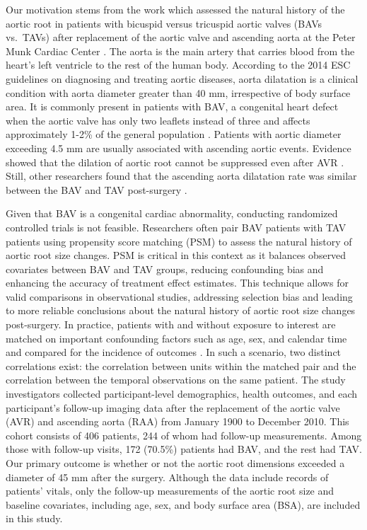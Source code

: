 \documentclass[
]{aft}
\begin{document}
Our motivation stems from the work which assessed the natural history of
the aortic root in patients with bicuspid versus tricuspid aortic valves
(BAVs vs.~TAVs) after replacement of the aortic valve and ascending
aorta at the Peter Munk Cardiac Center \citep{Hui2018}. The aorta is the
main artery that carries blood from the heart's left ventricle to the
rest of the human body. According to the 2014 ESC guidelines on
diagnosing and treating aortic diseases, aorta dilatation is a clinical
condition with aorta diameter greater than 40 mm, irrespective of body
surface area. It is commonly present in patients with BAV, a congenital
heart defect when the aortic valve has only two leaflets instead of
three and affects approximately 1-2\% of the general population
\citep{Wang2021}. Patients with aortic diameter exceeding 4.5 mm are
usually associated with ascending aortic events. Evidence showed that
the dilation of aortic root cannot be suppressed even after AVR
\citep{Bruce2003}. Still, other researchers found that the ascending
aorta dilatation rate was similar between the BAV and TAV post-surgery
\citep{KIM202053}.

Given that BAV is a congenital cardiac abnormality, conducting
randomized controlled trials is not feasible. Researchers often pair BAV
patients with TAV patients using propensity score matching (PSM) to
assess the natural history of aortic root size changes. PSM is critical
in this context as it balances observed covariates between BAV and TAV
groups, reducing confounding bias and enhancing the accuracy of
treatment effect estimates. This technique allows for valid comparisons
in observational studies, addressing selection bias and leading to more
reliable conclusions about the natural history of aortic root size
changes post-surgery. In practice, patients with and without exposure to
interest are matched on important confounding factors such as age, sex,
and calendar time and compared for the incidence of outcomes
\citep{Iwagami2022}. In such a scenario, two distinct correlations
exist: the correlation between units within the matched pair and the
correlation between the temporal observations on the same patient. The
study investigators collected participant-level demographics, health
outcomes, and each participant's follow-up imaging data after the
replacement of the aortic valve (AVR) and ascending aorta (RAA) from
January 1900 to December 2010. This cohort consists of 406 patients, 244
of whom had follow-up measurements. Among those with follow-up visits,
172 (70.5\%) patients had BAV, and the rest had TAV. Our primary outcome
is whether or not the aortic root dimensions exceeded a diameter of 45
mm after the surgery. Although the data include records of patients'
vitals, only the follow-up measurements of the aortic root size and
baseline covariates, including age, sex, and body surface area (BSA),
are included in this study.
\end{document}
